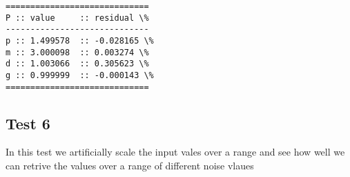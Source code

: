 \documentclass{article}
\begin{document}
    \begin{Verbatim}[commandchars=\\\{\}]
=============================
P :: value     :: residual \%
-----------------------------
p :: 1.499578  :: -0.028165 \%
m :: 3.000098  :: 0.003274 \%
d :: 1.003066  :: 0.305623 \%
g :: 0.999999  :: -0.000143 \%
=============================
    \end{Verbatim}

    \subsection{}\label{section}

\subsection{Test 6}\label{test-6}

In this test we artificially scale the input vales over a range and see
how well we can retrive the values over a range of different noise
vlaues
\end{document}
